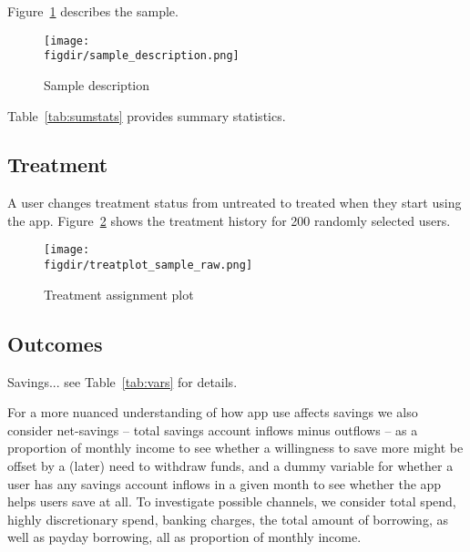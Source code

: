Figure~\ref{fig:sample_description} describes the sample.

\begin{figure}[htpb]
    \centering
    \caption{Sample description}%
    \texttt{[image: \\figdir/sample\_description.png]}
    \label{fig:sample_description}
    \fignote{\textwidth}{}
\end{figure}

Table~\ref{tab:sumstats} provides summary statistics.




\subsection{Treatment}%
\label{sub:treatment}

A user changes treatment status from untreated to treated when they start using
the app. Figure~\ref{fig:treatplot_sample_raw} shows the treatment history for
200 randomly selected users.

\begin{figure}[htpb]
    \centering
    \caption{Treatment assignment plot}%
    \texttt{[image: \\figdir/treatplot\_sample\_raw.png]}
    \label{fig:treatplot_sample_raw}


\end{figure}


\subsection{Outcomes}%
\label{sub:outcomes}

Savings... see Table~\ref{tab:vars} for details.

For a more nuanced understanding of how app use affects savings we also
consider net-savings -- total savings account inflows minus outflows -- as a
proportion of monthly income to see whether a willingness to save more might be
offset by a (later) need to withdraw funds, and a dummy variable for whether a
user has any savings account inflows in a given month to see whether the app
helps users save at all. To investigate possible channels, we consider total
spend, highly discretionary spend, banking charges, the total amount of
borrowing, as well as payday borrowing, all as proportion of monthly income.

